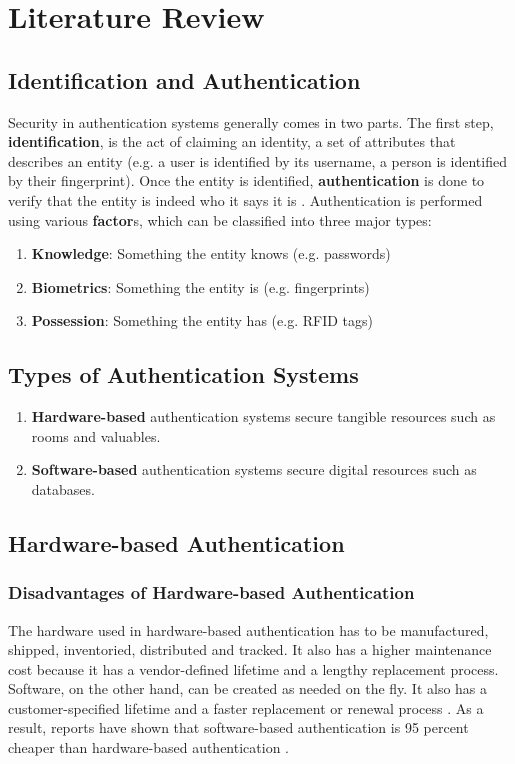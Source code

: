 \section{Literature Review}

\subsection{Identification and Authentication}
Security in authentication systems generally comes in two parts. The first step, \textbf{identification}, is the act of claiming an identity, a set of attributes that describes an entity (e.g. a user is identified by its username, a person is identified by their fingerprint). Once the entity is identified, \textbf{authentication} is done to verify that the entity is indeed who it says it is \cite{Pasupathinathan2009}. Authentication is performed using various \textbf{factor}s, which can be classified into three major types:
\begin{enumerate}
\item \textbf{Knowledge}: Something the entity knows (e.g. passwords)
\item \textbf{Biometrics}: Something the entity is (e.g. fingerprints)
\item \textbf{Possession}: Something the entity has (e.g. RFID tags) 
\end{enumerate}

\subsection{Types of Authentication Systems}
\begin{enumerate}
    \item \textbf{Hardware-based} authentication systems secure tangible resources such as rooms and valuables.
    \item \textbf{Software-based} authentication systems secure digital resources such as databases.
\end{enumerate}

\subsection{Hardware-based Authentication}
\subsubsection{Disadvantages of Hardware-based Authentication}
The hardware used in hardware-based authentication has to be manufactured, shipped, inventoried, distributed and tracked. It also has a higher maintenance cost because it has a vendor-defined lifetime and a lengthy replacement process. Software, on the other hand, can be created as needed on the fly. It also has a customer-specified lifetime and a faster replacement or renewal process \cite{AAMHS2011}. As a result, reports have shown that software-based authentication is 95 percent cheaper than hardware-based authentication \cite{InfoSecurity2012}.
    
